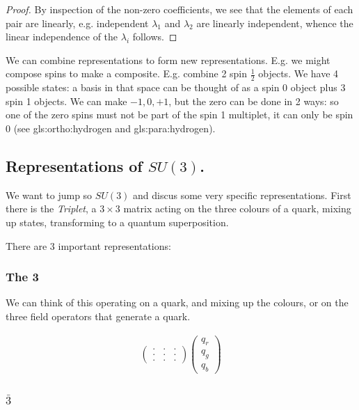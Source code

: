 \documentclass[]{article}
\begin{document}
\begin{proof}
	By inspection of the non-zero coefficients, we see that the elements of each pair are linearly, e.g. independent $\lambda_1$ and $\lambda_2$ are linearly independent, whence the linear independence of the $\lambda_i$ follows.

\end{proof}

We can combine representations to form new representations. E.g. we might compose spins to make a composite. E.g. combine 2 spin $\frac{1}{2}$ objects. We have 4 possible states: a basis in that space can be thought of as a spin 0 object plus 3 spin 1 objects. We can make ${-1,0,+1}$, but the zero can be done in 2 ways: so one of the zero spins must not be part of the spin 1 multiplet, it can only be spin 0 (see \gls{gls:ortho:hydrogen} and \gls{gls:para:hydrogen}).

\subsection{Representations of $SU(3)$.}
 
We want to jump so $SU(3)$ and discus some very specific representations. First there is the \emph{Triplet}, a $3\times3$ matrix acting on the three colours of a quark, mixing up states, transforming to a quantum superposition.

There are 3 important representations: 

\subsubsection{The \bfseries{3}}
We can think of this operating on a quark, and mixing up the colours, or on the three field operators that generate a quark.

\begin{align*}
	\begin{pmatrix}
		.&.&.\\
		.&.&.\\
		.&.&.
	\end{pmatrix}
	\begin{pmatrix}
		q_r\\
		q_g\\
		q_b
	\end{pmatrix}
\end{align*} 

\subsubsection{$\bar{3}$}
\end{document}
